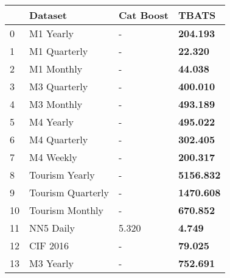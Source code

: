 \begin{tabular}{llll}
\toprule
 & Dataset & Cat Boost & TBATS \\
\midrule
0 & M1 Yearly & - & \textbf{204.193} \\
1 & M1 Quarterly & - & \textbf{22.320} \\
2 & M1 Monthly & - & \textbf{44.038} \\
3 & M3 Quarterly & - & \textbf{400.010} \\
4 & M3 Monthly & - & \textbf{493.189} \\
5 & M4 Yearly & - & \textbf{495.022} \\
6 & M4 Quarterly & - & \textbf{302.405} \\
7 & M4 Weekly & - & \textbf{200.317} \\
8 & Tourism Yearly & - & \textbf{5156.832} \\
9 & Tourism Quarterly & - & \textbf{1470.608} \\
10 & Tourism Monthly & - & \textbf{670.852} \\
11 & NN5 Daily & 5.320 & \textbf{4.749} \\
12 & CIF 2016 & - & \textbf{79.025} \\
13 & M3 Yearly & - & \textbf{752.691} \\
\bottomrule
\end{tabular}

